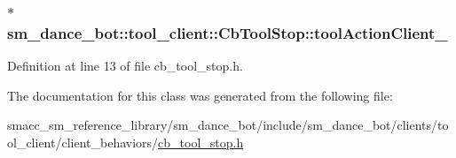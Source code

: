 \subsubsection[{\texorpdfstring{tool\+Action\+Client\+\_\+}{toolActionClient_}}]{$\ast$ sm\+\_\+dance\+\_\+bot\+::tool\+\_\+client\+::\+Cb\+Tool\+Stop\+::tool\+Action\+Client\+\_\+}\hypertarget{classsm__dance__bot_1_1tool__client_1_1CbToolStop_a24bc2a097e7c8ab92c7a7a539720db17}{}\label{classsm__dance__bot_1_1tool__client_1_1CbToolStop_a24bc2a097e7c8ab92c7a7a539720db17}


Definition at line 13 of file cb\+\_\+tool\+\_\+stop.\+h.



The documentation for this class was generated from the following file\+:\begin{DoxyCompactItemize}
\item 
smacc\+\_\+sm\+\_\+reference\+\_\+library/sm\+\_\+dance\+\_\+bot/include/sm\+\_\+dance\+\_\+bot/clients/tool\+\_\+client/client\+\_\+behaviors/\hyperlink{cb__tool__stop_8h}{cb\+\_\+tool\+\_\+stop.\+h}\end{DoxyCompactItemize}
